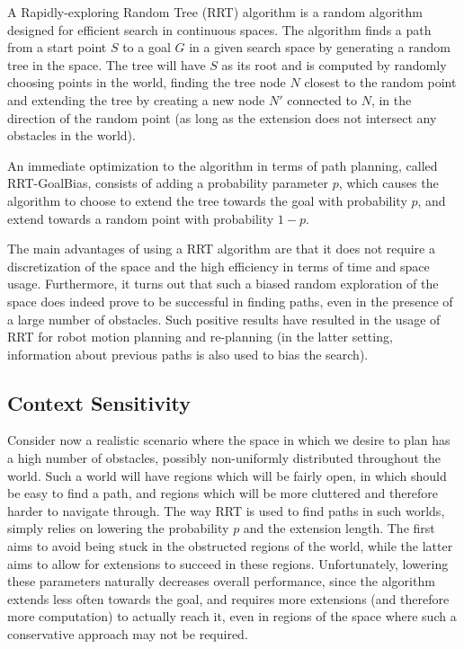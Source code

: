 \documentclass[10pt,twoside,twocolumn]{article}
\begin{document}
A Rapidly-exploring Random Tree (RRT) algorithm is a random algorithm designed for efficient search in
continuous spaces. The algorithm finds a path from a start point $S$ to a goal $G$ in a given search space 
by generating a random tree in the space. The tree will have $S$ as its root and is computed by randomly
choosing points in the world, finding the tree node $N$ closest to the random point and extending the tree by
creating a new node $N'$ connected to $N$, in the direction of the random point (as long as the extension does not
intersect any obstacles in the world). 

An immediate optimization to the algorithm in terms of path planning, called RRT-GoalBias, consists of adding a probability
parameter $p$, which causes the algorithm to choose to extend the tree towards the goal with probability $p$,
and extend towards a random point with probability $1-p$. 

The main advantages of using a RRT algorithm are that it does not require a discretization of the space and the high
efficiency in terms of time and space usage. Furthermore, it turns out that such a biased random exploration of the space
does indeed prove to be successful in finding paths, even in the presence of a large number of obstacles. Such positive
results have resulted in the usage of RRT for robot motion planning and re-planning (in the latter setting, information
about previous paths is also used to bias the search).

\subsection{Context Sensitivity}
Consider now a realistic scenario where the space in which we desire to plan has a high number of obstacles, possibly 
non-uniformly distributed throughout the world.
Such a world will have regions which will be fairly open, in which should be easy to find a path, and regions which will
be more cluttered and therefore harder to navigate through. The way RRT is used to find paths in such worlds, simply relies
on lowering the probability $p$ and the extension length. The first aims to avoid being stuck in the obstructed regions of the world,
while the latter aims to allow for extensions to succeed in these regions. Unfortunately, lowering these parameters naturally
decreases overall performance, since the algorithm extends less often towards the goal, and requires more extensions 
(and therefore more computation) to actually reach it, even in regions of the space where such a conservative approach may not be required.
\end{document}
